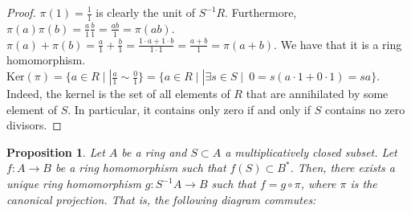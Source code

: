 \documentclass[11pt]{article}
\newtheorem{prop}[theorem]{Proposition}
\theoremstyle{definition}
\begin{document}
            \begin{proof}
                $\pi(1) = \frac{1}{1}$ is clearly the unit of $S^{-1}R$.
                Furthermore, $\pi(a) \pi(b) = \frac{a}{1} \frac{b}{1} = \frac{ab}{1} = \pi(ab)$.
                $\pi(a) + \pi(b) = \frac{a}{1} + \frac{b}{1} = \frac{1 \cdot a + 1 \cdot b}{1 \cdot 1} = \frac{a+b}{1} = \pi(a + b)$.
                We have that it is a ring homomorphism. $\text{Ker}(\pi) = \{a \in R \mid | \frac{a}{1} \sim \frac{0}{1}\} =
                \{a \in R \mid | \exists s \in S \mid \ 0 = s (a \cdot 1 + 0 \cdot 1) = sa\}$.
                Indeed, the kernel is the set of all elements of $R$ that are annihilated by some element of $S$.
                In particular, it contains only zero if and only if $S$ contains no zero divisors.
            \end{proof}

        \begin{prop} \label{prop:universal-property-fractions}
            Let $A$ be a ring and $S \subset A$ a multiplicatively closed subset.
            Let $f: A \rightarrow B$ be a ring homomorphism such that $f(S) \subset B^*$.
            Then, there exists a unique ring homomorphism
            $g: S^{-1}A \rightarrow B$ such that $f = g \circ \pi$, where $\pi$
            is the canonical projection.
            That is, the following diagram commutes:

            \begin{center}
            \end{center}

        \end{prop}
\end{document}

